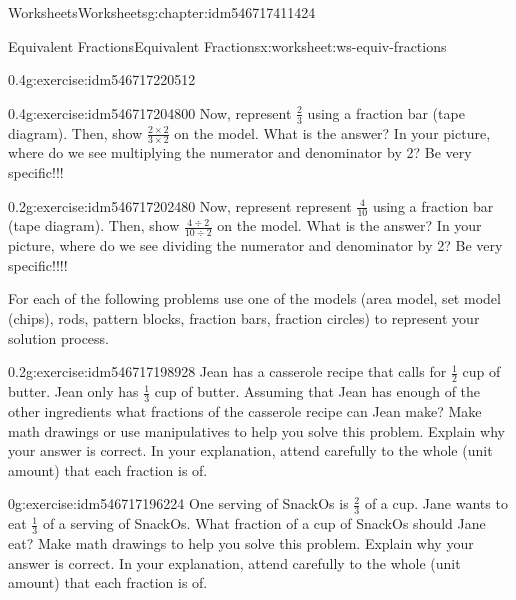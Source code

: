\documentclass[twoside,11pt,]{book}
\begin{document}
\begin{chapterptx}{Worksheets}{}{Worksheets}{}{}{g:chapter:idm546717411424}
\begin{worksheet-section-numberless}{Equivalent Fractions}{}{Equivalent Fractions}{}{}{x:worksheet:ws-equiv-fractions}
\begin{divisionexercise}{1}{}{0.4}{g:exercise:idm546717220512}
\end{divisionexercise}%
\begin{divisionexercise}{2}{}{0.4}{g:exercise:idm546717204800}%
Now, represent \(\frac{2}{3} \) using a fraction bar (tape diagram). Then, show  \(\frac{2 \times 2}{3 \times 2} \) on the model. What is the answer? In your picture, where do we see multiplying the numerator and denominator by 2? Be very specific!!!%
\end{divisionexercise}%
\begin{divisionexercise}{3}{}{0.2}{g:exercise:idm546717202480}%
Now, represent represent \(\frac{4}{10} \) using a fraction bar (tape diagram). Then, show  \(\frac{4 \div 2}{10 \div 2} \) on the model. What is the answer? In your picture, where do we see dividing the numerator and denominator by 2? Be very specific!!!!%
\end{divisionexercise}%
\begin{introduction}{}%
For each of the following problems use one of the models (area model, set model (chips), rods, pattern blocks, fraction bars, fraction circles) to represent your solution process.%
\end{introduction}%
\begin{divisionexercise}{4}{}{0.2}{g:exercise:idm546717198928}%
Jean has a casserole recipe that calls for \(\frac{1}{2} \) cup of butter. Jean only has \(\frac{1}{3} \) cup of butter. Assuming that Jean has enough of the other ingredients what fractions of the casserole recipe can Jean make? Make math drawings or use manipulatives to help you solve this problem. Explain why your answer is correct. In your explanation, attend carefully to the whole (unit amount) that each fraction is of.%
\end{divisionexercise}%
\begin{divisionexercise}{5}{}{0}{g:exercise:idm546717196224}%
One serving of SnackOs is \(\frac{2}{3} \) of a cup. Jane wants to eat \(\frac{1}{3} \) of a serving of SnackOs. What fraction of a cup of SnackOs should Jane eat? Make math drawings to help you solve this problem. Explain why your answer is correct. In your explanation, attend carefully to the whole (unit amount) that each fraction is of.%
\end{divisionexercise}%
\end{worksheet-section-numberless}
\restoregeometry
%
%
\typeout{************************************************}
\typeout{************************************************}
%

\end{chapterptx}
\end{document}
